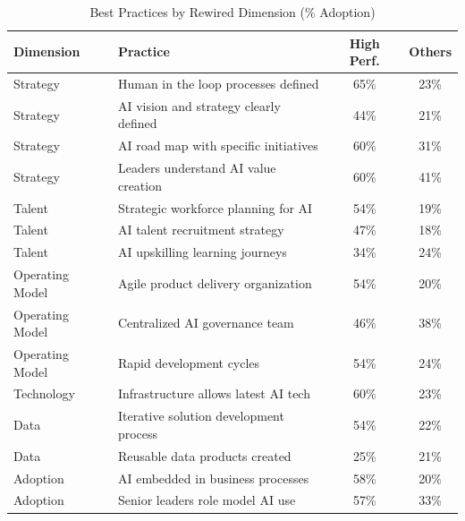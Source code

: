 \begin{table}[htbp]
\centering
\caption{Best Practices by Rewired Dimension (\% Adoption)}
\label{tab:vvv1-practices}
\renewcommand{\arraystretch}{1.3}
\begin{tabular}{@{}llcc@{}}
\toprule
\textbf{Dimension} & \textbf{Practice} & \textbf{High Perf.} & \textbf{Others} \\
\midrule
Strategy & Human in the loop processes defined & 65\% & 23\% \\
Strategy & AI vision and strategy clearly defined & 44\% & 21\% \\
Strategy & AI road map with specific initiatives & 60\% & 31\% \\
Strategy & Leaders understand AI value creation & 60\% & 41\% \\
\midrule
Talent & Strategic workforce planning for AI & 54\% & 19\% \\
Talent & AI talent recruitment strategy & 47\% & 18\% \\
Talent & AI upskilling learning journeys & 34\% & 24\% \\
\midrule
Operating Model & Agile product delivery organization & 54\% & 20\% \\
Operating Model & Centralized AI governance team & 46\% & 38\% \\
Operating Model & Rapid development cycles & 54\% & 24\% \\
\midrule
Technology & Infrastructure allows latest AI tech & 60\% & 23\% \\
\midrule
Data & Iterative solution development process & 54\% & 22\% \\
Data & Reusable data products created & 25\% & 21\% \\
\midrule
Adoption & AI embedded in business processes & 58\% & 20\% \\
Adoption & Senior leaders role model AI use & 57\% & 33\% \\
\bottomrule
\end{tabular}
\end{table}

